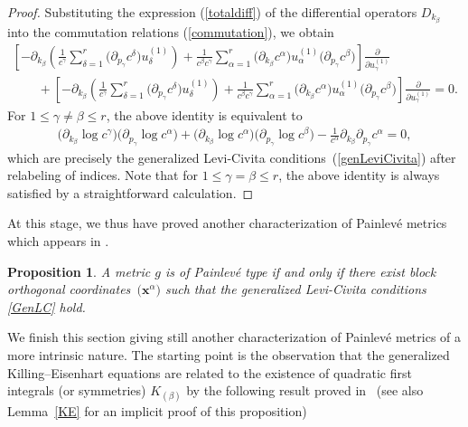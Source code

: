 \documentclass[11pt]{article}
\numberwithin{equation}{section}
\newtheorem{Proposition}[Theorem]{Proposition}
 { \theoremstyle{definition}
\newtheorem{Definition}[Theorem]{Definition}
\newtheorem{Example}[Theorem]{Example}
\newtheorem{Remark}[Theorem]{Remark} }
\newcommand{\kbeta}{k_{\beta}}
\newcommand{\pgamma}{p_{\gamma}}
\begin{document}
\begin{proof}Substituting the expression (\ref{totaldiff}) of the differential operators $D_{\kbeta}$ into the commutation relations (\ref{commutation}), we obtain
 \begin{gather*}
 \left[-\partial_{\kbeta}\left(\frac{1}{c^{\gamma}}\sum_{\delta =1}^{r}\big(\partial_{\pgamma} c^{\delta}\big)u^{(1)}_{\delta}\right) + \frac{1}{c^{\beta} c^{\gamma}}\sum_{\alpha =1}^{r}\big(\partial_{\kbeta} c^{\alpha}\big)u^{(1)}_{\alpha}\big(\partial_{\pgamma} c^{\beta}\big)\right]\frac{\partial}{\partial u^{(1)}_{\gamma}} \\
 \qquad{} +
 \left[-\partial_{\kbeta}\left(\frac{1}{c^{\gamma}}\sum_{\delta =1}^{r}\big(\partial_{\pgamma} c^{\delta}\big)u^{(1)}_{\delta}\right)+\frac{1}{c^{\beta}c^{\gamma}}\sum_{\alpha =1}^{r}\big(\partial_{\kbeta}c^{\alpha}\big)u^{(1)}_{\alpha}\big(\partial_{\pgamma} c^{\beta}\big)\right]\frac{\partial}{\partial u^{(1)}_{\gamma}}=0.
 \end{gather*}
For $1\leq \gamma \neq \beta \leq r$, the above identity is equivalent to
\begin{gather} \label{GenLC}
\big(\partial_{\kbeta} \log c^{\gamma}\big)\big(\partial_{\pgamma} \log c^{\alpha}\big)+\big(\partial_{\kbeta} \log c^{\alpha}\big)\big(\partial_{\pgamma} \log c^{\beta}\big)-\frac{1}{c^{\alpha}}\partial_{\kbeta}\partial_{\pgamma}c^{\alpha}=0,
\end{gather}
which are precisely the generalized Levi-Civita conditions~(\ref{genLeviCivita}) after relabeling of indices. Note that for $1\leq \gamma = \beta \leq r$, the above identity is always satisfied by a straightforward calculation.
\end{proof}

At this stage, we thus have proved another characterization of Painlev\'e metrics which appears in \cite[p.~12]{CR2019}.

\begin{Proposition} \label{PainLC}A metric $g$ is of Painlev\'e type if and only if there exist block orthogonal coordinates~$\big(\textbf{x}^\alpha\big)$ such that the generalized Levi-Civita conditions \eqref{GenLC} hold.
\end{Proposition}

We finish this section giving still another characterization of Painlev\'e metrics of a more intrinsic nature. The starting point is the observation that the generalized Killing--Eisenhart equations are related to the existence of quadratic first integrals (or symmetries) $K_{(\beta)}$ by the following result proved in~\cite[Proposition~5.3]{CR2019} (see also Lemma~\ref{KE} for an implicit proof of this proposition)
\end{document}
